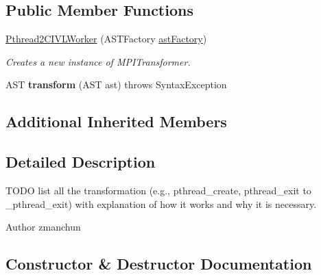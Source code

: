 \subsection*{Public Member Functions}
\begin{DoxyCompactItemize}
\item 
\hyperlink{classedu_1_1udel_1_1cis_1_1vsl_1_1civl_1_1transform_1_1common_1_1Pthread2CIVLWorker_a0c60b471d6b1029e0ff5144ef272fb00}{Pthread2\+C\+I\+V\+L\+Worker} (A\+S\+T\+Factory \hyperlink{classedu_1_1udel_1_1cis_1_1vsl_1_1civl_1_1transform_1_1common_1_1BaseWorker_a44812bb476e4511fb6ca29a808427186}{ast\+Factory})
\begin{DoxyCompactList}\small\item\em Creates a new instance of M\+P\+I\+Transformer. \end{DoxyCompactList}\item 
\hypertarget{classedu_1_1udel_1_1cis_1_1vsl_1_1civl_1_1transform_1_1common_1_1Pthread2CIVLWorker_a61edbbacc8de0e68dbb5c3f6243dd17e}{}A\+S\+T {\bfseries transform} (A\+S\+T ast)  throws Syntax\+Exception \label{classedu_1_1udel_1_1cis_1_1vsl_1_1civl_1_1transform_1_1common_1_1Pthread2CIVLWorker_a61edbbacc8de0e68dbb5c3f6243dd17e}

\end{DoxyCompactItemize}
\subsection*{Additional Inherited Members}


\subsection{Detailed Description}
T\+O\+D\+O list all the transformation (e.\+g., pthread\+\_\+create, pthread\+\_\+exit to \+\_\+pthread\+\_\+exit) with explanation of how it works and why it is necessary. 

\begin{DoxyAuthor}{Author}
zmanchun 
\end{DoxyAuthor}


\subsection{Constructor \& Destructor Documentation}
\hypertarget{classedu_1_1udel_1_1cis_1_1vsl_1_1civl_1_1transform_1_1common_1_1Pthread2CIVLWorker_a0c60b471d6b1029e0ff5144ef272fb00}{}
